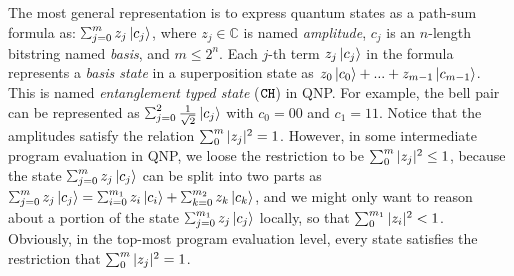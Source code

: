 The most general representation is to express quantum states as a path-sum formula as: $\sch{m}{z_j}{c_j}$, where $z_j\in \mathbb{C}$ is named \emph{amplitude}, $c_j$ is an $n$-length bitstring named \emph{basis}, and $m \le 2^n$. Each $j$-th term ${z_j}\left\vert{c_j}\right\rangle$ in the formula represents a \emph{basis state} in a superposition state as ${z_0}\left\vert{c_0}\right\rangle+...+{z_{m-1}}\left\vert{c_{m-1}}\right\rangle$. 
This is named \textit{entanglement typed state} ($\texttt{CH}$) in QNP.
For example, the bell pair can be represented as $\sch{2}{\frac{1}{\sqrt{2}}}{c_j}$ with $c_0=00$ and $c_1=11$.
Notice that the amplitudes satisfy the relation $\sum_{0}^{m}|z_j|^2 = 1$. However, in some intermediate program evaluation in QNP, we loose the restriction to be $\sum_{0}^{m}|z_j|^2 \le 1$, because the state $\sch{m}{z_j}{c_j}$ can be split into two parts as $\sch{m}{z_j}{c_j}=\schii{m_1}{z_i}{c_i}+\schk{m_2}{z_k}{c_k}$, and we might only want to reason about a portion of the state $\sch{m_1}{z_j}{c_j}$ locally, so that $\sum_{0}^{m_1}|z_i|^2 < 1$. Obviously, in the top-most program evaluation level, every state satisfies the restriction that $\sum_{0}^{m}|z_j|^2 = 1$.

